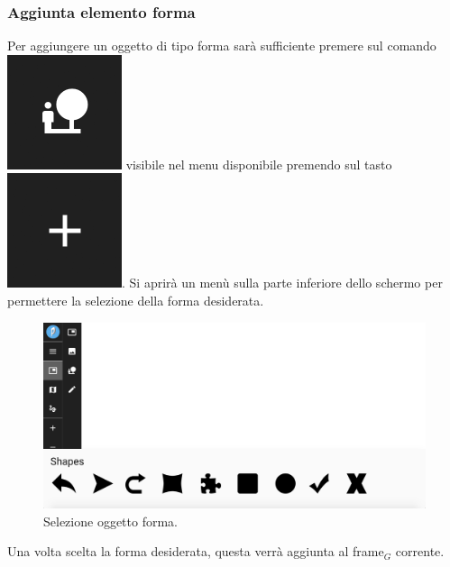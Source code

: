 \newpage
\subsubsection{Aggiunta elemento forma}
Per aggiungere un oggetto di tipo forma sarà sufficiente premere sul comando \includegraphics[scale=0.4]{img/add_shape.png} visibile nel menu disponibile premendo sul tasto \includegraphics[scale=0.4]{img/add_object.png}. Si aprirà un menù sulla parte inferiore dello schermo per permettere la selezione della forma desiderata.\\
\begin{figure}[h]
\begin{center}
\includegraphics[scale=0.35]{img/sel_shape.png}
\caption{Selezione oggetto forma.}
\end{center}
\end{figure}

Una volta scelta la forma desiderata, questa verrà aggiunta al frame$_G$ corrente.

\newpage
